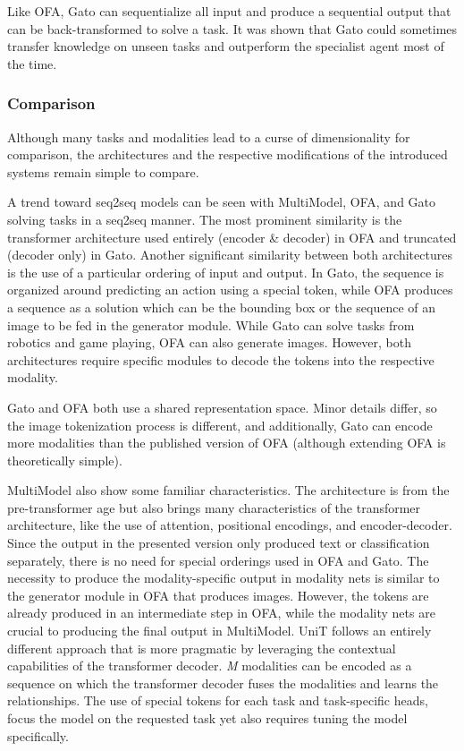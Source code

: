 \documentclass[
]{krantz}
\begin{document}
Like OFA, Gato can sequentialize all input and produce a sequential output that can be back-transformed to solve a task. It was shown that Gato could sometimes transfer knowledge on unseen tasks and outperform the specialist agent most of the time.

\hypertarget{comparison}{%
\subsubsection{Comparison}\label{comparison}}

Although many tasks and modalities lead to a curse of dimensionality for comparison, the architectures and the respective modifications of the introduced systems remain simple to compare.

A trend toward seq2seq models can be seen with MultiModel, OFA, and Gato solving tasks in a seq2seq manner. The most prominent similarity is the transformer architecture used entirely
(encoder \& decoder) in OFA and truncated (decoder only) in Gato. Another significant similarity between both architectures is the use of a particular ordering of input and output.
In Gato, the sequence is organized around predicting an action using a special token, while OFA produces a sequence as a solution which can be the bounding box or the sequence of an image
to be fed in the generator module. While Gato can solve tasks from robotics and game playing, OFA can also generate images. However, both architectures require specific modules to decode the tokens into
the respective modality.

Gato and OFA both use a shared representation space. Minor details differ, so the image tokenization process is different, and additionally, Gato can encode more modalities than the published
version of OFA (although extending OFA is theoretically simple).

MultiModel also show some familiar characteristics. The architecture is from the pre-transformer age but also brings many characteristics of the transformer architecture, like the use of
attention, positional encodings, and encoder-decoder. Since the output in the presented version only produced text or classification separately, there is no need for special orderings used
in OFA and Gato.
The necessity to produce the modality-specific output in modality nets is similar to the generator module in OFA that produces images. However, the tokens are already produced in an
intermediate step in OFA, while the modality nets are crucial to producing the final output in MultiModel. UniT follows an entirely different approach that is more pragmatic by leveraging the
contextual capabilities of the transformer decoder.
\emph{M} modalities can be encoded as a sequence on which the transformer decoder fuses the modalities and learns the relationships. The use of special tokens for each task and task-specific heads,
focus the model on the requested task yet also requires tuning the model specifically.
\end{document}
